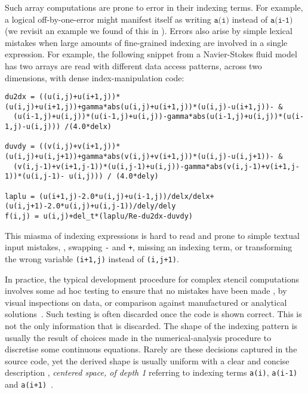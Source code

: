 Such array computations are prone to error in their indexing
terms. For example, a logical off-by-one-error might manifest itself
as writing $\texttt{a(i)}$ instead of $\texttt{a(i-1)}$ (we revisit an
example we found of this in ).
Errors also arise by simple lexical mistakes when large amounts of
fine-grained indexing are involved in a single expression. For
example, the following snippet from a Navier-Stokes
fluid model~\citet{griebel1997numerical} has two arrays are
read with different data access patterns, across two dimensions, with
dense index-manipulation code:
\begin{verbatim}
du2dx = ((u(i,j)+u(i+1,j))*(u(i,j)+u(i+1,j))+gamma*abs(u(i,j)+u(i+1,j))*(u(i,j)-u(i+1,j))- &
  (u(i-1,j)+u(i,j))*(u(i-1,j)+u(i,j))-gamma*abs(u(i-1,j)+u(i,j))*(u(i-1,j)-u(i,j))) /(4.0*delx)

duvdy = ((v(i,j)+v(i+1,j))*(u(i,j)+u(i,j+1))+gamma*abs(v(i,j)+v(i+1,j))*(u(i,j)-u(i,j+1))- &
  (v(i,j-1)+v(i+1,j-1))*(u(i,j-1)+u(i,j))-gamma*abs(v(i,j-1)+v(i+1,j-1))*(u(i,j-1)- u(i,j))) / (4.0*dely)

laplu = (u(i+1,j)-2.0*u(i,j)+u(i-1,j))/delx/delx+(u(i,j+1)-2.0*u(i,j)+u(i,j-1))/dely/dely
f(i,j) = u(i,j)+del_t*(laplu/Re-du2dx-duvdy)
\end{verbatim}
%
This miasma of indexing expressions is hard to read and
prone to simple textual input mistakes, \eg{}, swapping \texttt{-} and
\texttt{+}, missing an indexing term, or transforming the wrong
variable \eg{} \texttt{(i+1,j)} instead of \texttt{(i,j+1)}.

In practice, the typical development procedure for complex stencil
computations involves some ad hoc testing to ensure that no
mistakes have been made \eg{}, by visual inspections on data,
or comparison against manufactured or analytical
solutions~\cite{farrell2010automated}. Such testing is often
discarded once the code is shown correct. This is not the only
information that is discarded. The shape of the indexing pattern
is usually the result of choices made in the numerical-analysis
procedure to discretise some continuous equations. Rarely are these decisions captured in the source code,
yet the derived shape is usually uniform with a
clear and concise description \eg{},
\emph{centered space, of depth 1} referring to indexing
terms \texttt{a(i)}, \texttt{a(i-1)} and
\texttt{a(i+1)}~\cite{recktenwald2004finite}.

